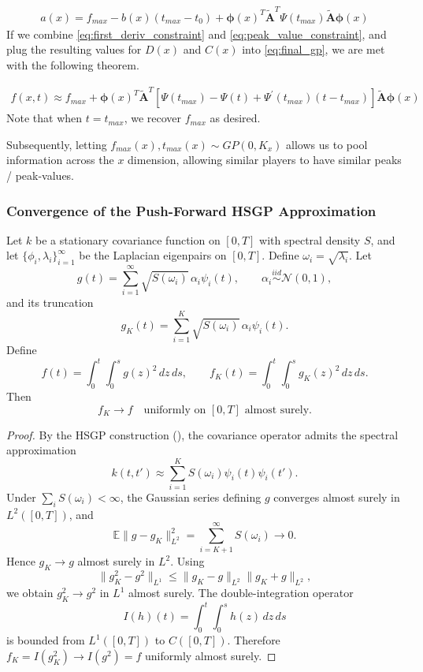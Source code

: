 \begin{align}
\label{eq:peak_value_constraint}
    a(x) = f_{max} - b(x)(t_{max} - t_0) + \mathbf{\phi}(x)^T \mathbf{\tilde{A}}^T \Psi(t_{max}) \mathbf{\tilde{A}} \mathbf{\phi}(x)
\end{align}
If we combine \eqref{eq:first_deriv_constraint} and \eqref{eq:peak_value_constraint}, and plug the resulting values for $D(x)$ and $C(x)$ into \eqref{eq:final_gp}, we are met with the following theorem.

\begin{align}
\label{eq:max_constraint_gp_app}
    f(x,t) \approx f_{max}  +  \mathbf{\phi}(x)^T\mathbf{\tilde{A}}^T [ \Psi(t_{max}) - \Psi(t) + \Psi^{'}(t_{max})(t - t_{max}) ] \mathbf{\tilde{A}} \mathbf{\phi}(x)
\end{align}
Note that when $t = t_{max}$, we recover $f_{max}$ as desired.

Subsequently, letting $f_{max}(x) , t_{max}(x) \sim GP(0, K_x)$ allows us to pool information across the $x$ dimension, allowing similar players to have similar peaks / peak-values.

\subsubsection{Convergence of the Push-Forward HSGP Approximation}


\begin{proposition}
\label{prop:hsgp_convergence_proof}
Let $k$ be a stationary covariance function on $[0,T]$ with spectral
density $S$, and let $\{\phi_i,\lambda_i\}_{i=1}^\infty$ be the Laplacian
eigenpairs on $[0,T]$.
Define $\omega_i = \sqrt{\lambda_i}$.
Let
\[
g(t)
=
\sum_{i=1}^\infty
\sqrt{S(\omega_i)}\,\alpha_i \psi_i(t),
\qquad
\alpha_i \stackrel{iid}{\sim} \mathcal{N}(0,1),
\]
and its truncation
\[
g_K(t)
=
\sum_{i=1}^K
\sqrt{S(\omega_i)}\,\alpha_i \psi_i(t).
\]
Define
\[
f(t)
=
\int_0^t \int_0^s g(z)^2\,dz\,ds,
\qquad
f_K(t)
=
\int_0^t \int_0^s g_K(z)^2\,dz\,ds.
\]
Then
\[
f_K \to f
\quad \text{uniformly on } [0,T] \text{ almost surely}.
\]
\end{proposition}


\begin{proof}
By the HSGP construction (\cite{Solin_2019}), the covariance
operator admits the spectral approximation
\[
k(t,t')
\approx
\sum_{i=1}^K S(\omega_i)\psi_i(t)\psi_i(t').
\]
Under $\sum_i S(\omega_i)<\infty$, the Gaussian series defining $g$
converges almost surely in $L^2([0,T])$, and
\[
\mathbb{E}\|g-g_K\|_{L^2}^2
=
\sum_{i=K+1}^\infty S(\omega_i)
\to 0.
\]
Hence $g_K \to g$ almost surely in $L^2$.
Using
\[
\|g_K^2 - g^2\|_{L^1}
\le
\|g_K-g\|_{L^2}\|g_K+g\|_{L^2},
\]
we obtain $g_K^2 \to g^2$ in $L^1$ almost surely.
The double-integration operator
\[
I(h)(t)=\int_0^t\int_0^s h(z)\,dz\,ds
\]
is bounded from $L^1([0,T])$ to $C([0,T])$.
Therefore $f_K = I(g_K^2) \to I(g^2)=f$ uniformly almost surely.
\end{proof}


